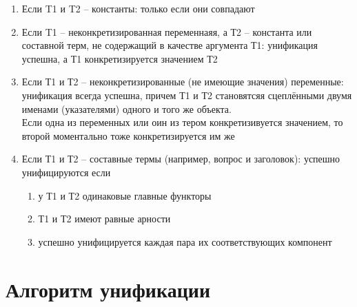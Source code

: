 \documentclass[12pt]{report}
\begin{document}
\begin{enumerate}
    \item Если T1 и T2 -- константы: только если они совпадают
    \item Если T1 -- неконкретизированная переменнаяя, а Т2 -- константа или составной терм, не содержащий в качестве аргумента Т1: унификация успешна, а Т1 конкретизируется значением Т2
    \item Если Т1 и Т2 -- неконкретизированные (не имеющие значения) переменные: унификация всегда успешна, причем Т1 и Т2 становятсяя сцеплёнными двумя именами (указателями) одного и того же объекта. \\Если одна из переменных или оин из тером конкретизивуется значением, то второй моментально тоже конкретизируется им же
    \item Если Т1 и Т2 -- составные термы (например, вопрос и заголовок): успешно унифицируются если
    \begin{enumerate}
        \item у Т1 и Т2 одинаковые главные функторы
        \item Т1 и Т2 имеют равные арности
        \item успешно унифицируется каждая пара их  соответствующих компонент
    \end{enumerate}
\end{enumerate}







\section*{Алгоритм унификации}
\end{document}
